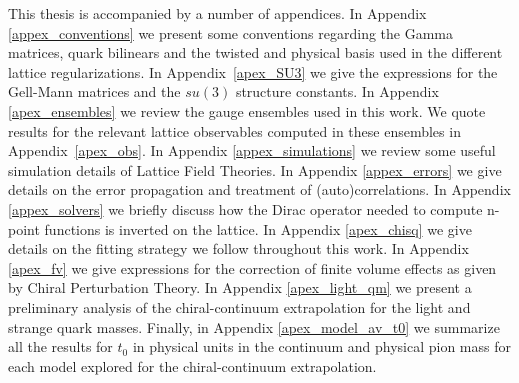 This thesis is accompanied by a number of appendices. In Appendix \ref{appex_conventions} we present some conventions regarding the Gamma matrices, quark bilinears and the twisted and physical basis used in the different lattice regularizations. In Appendix~\ref{apex_SU3} we give the expressions for the Gell-Mann matrices and the $su(3)$ structure constants. In Appendix \ref{apex_ensembles} we review the gauge ensembles used in this work. We quote results for the relevant lattice observables computed in these ensembles in Appendix~\ref{apex_obs}. In Appendix \ref{appex_simulations} we review some useful simulation details of Lattice Field Theories. In Appendix \ref{appex_errors} we give details on the error propagation and treatment of (auto)correlations. In Appendix \ref{appex_solvers} we briefly discuss how the Dirac operator needed to compute n-point functions is inverted on the lattice. In Appendix \ref{apex_chisq} we give details on the fitting strategy we follow throughout this work. In Appendix \ref{apex_fv} we give expressions for the correction of finite volume effects as given by Chiral Perturbation Theory. In Appendix \ref{apex_light_qm} we present a preliminary analysis of the chiral-continuum extrapolation for the light and strange quark masses. Finally, in Appendix \ref{apex_model_av_t0} we summarize all the results for $t_0$ in physical units in the continuum and physical pion mass for each model explored for the chiral-continuum extrapolation.

